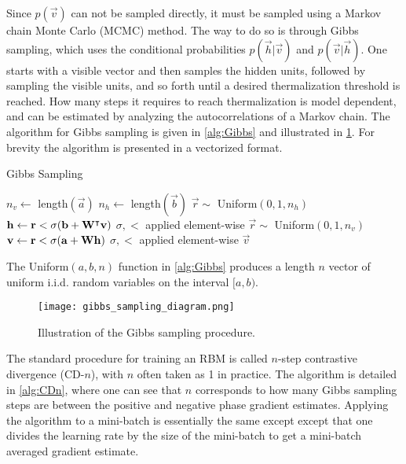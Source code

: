 Since \( p(\vec{v}) \) can not be sampled directly, it must be sampled using a Markov chain Monte Carlo (MCMC) method.
The way to do so is through Gibbs sampling, which uses the conditional probabilities \( p(\vec{h}|\vec{v}) \) and \( p(\vec{v}|\vec{h}) \).
One starts with a visible vector and then samples the hidden units, followed by sampling the visible units, and so forth until a desired thermalization threshold is reached.
How many steps it requires to reach thermalization is model dependent, and can be estimated by analyzing the autocorrelations of a Markov chain.
The algorithm for Gibbs sampling is given in \cref{alg:Gibbs} and illustrated in \cref{fig:gibbs_sampling_diagram}.
For brevity the algorithm is presented in a vectorized format.

\begin{algorithm}
\caption{Gibbs Sampling}
\begin{algorithmic}[1]
        \State $n_v \gets$ length$(\vec{a})$
        \State $n_h \gets$ length$(\vec{b})$
            \State $\vec{r} \sim$ Uniform$(0, 1, n_h)$
            \State $\mathbf{h} \gets \mathbf{r} < \sigma(\mathbf{b} + \mathbf{W}^\intercal\mathbf{v})$
                \Comment $\sigma, <$ applied element-wise
            \State $\vec{r} \sim$ Uniform$(0, 1, n_v)$
            \State $\mathbf{v} \gets \mathbf{r} < \sigma(\mathbf{a} + \mathbf{W}\mathbf{h})$
                \Comment $\sigma, <$ applied element-wise
        \EndFor
        \State \Return $\vec{v}$
    \EndProcedure
\end{algorithmic}
\label{alg:Gibbs}
\end{algorithm}
The Uniform$(a, b, n)$ function in \cref{alg:Gibbs} produces a length \( n \) vector of uniform i.i.d. random variables on the interval $[a, b)$.

\begin{figure}
    \begin{center}
        \texttt{[image: gibbs\_sampling\_diagram.png]}
    \end{center}
    \caption{Illustration of the Gibbs sampling procedure.}
    \label{fig:gibbs_sampling_diagram}
\end{figure}

The standard procedure for training an RBM is called \( n \)-step contrastive divergence (CD-\( n \)), with \( n \) often taken as 1 in practice.
The algorithm is detailed in \cref{alg:CDn}, where one can see that \( n \) corresponds to how many Gibbs sampling steps are between the positive and negative phase gradient estimates.
Applying the algorithm to a mini-batch is essentially the same except except that one divides the learning rate by the size of the mini-batch to get a mini-batch averaged gradient estimate.

